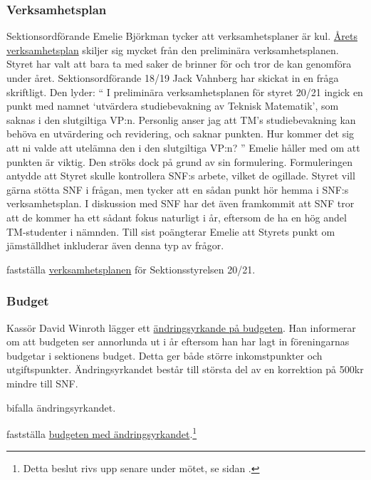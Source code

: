 \documentclass[hidelinks]{../sektionsmote} %
\begin{document}
\subsubsection{Verksamhetsplan}
Sektionsordförande Emelie Björkman tycker att verksamhetsplaner är kul.
\hyperlink{bilagor/styret/vp.pdf.1}{Årets verksamhetsplan} skiljer sig mycket från den preliminära verksamhetsplanen.
Styret har valt att bara ta med saker de brinner för och tror de kan genomföra under året.
Sektionsordförande 18/19 Jack Vahnberg har skickat in en fråga skriftligt.
Den lyder:
\enquote{%
    I preliminära verksamhetsplanen för styret 20/21 ingick en punkt med namnet \enquote{utvärdera studiebevakning av Teknisk Matematik}, som saknas i den slutgiltiga VP:n.
    Personlig anser jag att TM's studiebevakning kan behöva en utvärdering och revidering, och saknar punkten.
    Hur kommer det sig att ni valde att utelämna den i den slutgiltiga VP:n?%
}
Emelie håller med om att punkten är viktig.
Den ströks dock på grund av sin formulering.
Formuleringen antydde att Styret skulle kontrollera SNF:s arbete, vilket de ogillade.
Styret vill gärna stötta SNF i frågan, men tycker att en sådan punkt hör hemma i SNF:s verksamhetsplan.
I diskussion med SNF har det även framkommit att SNF tror att de kommer ha ett sådant fokus naturligt i år, eftersom de ha en hög andel TM-studenter i nämnden.
Till sist poängterar Emelie att Styrets punkt om jämställdhet inkluderar även denna typ av frågor.
\begin{beslut}
    \item fastställa \hyperlink{bilagor/styret/vp.pdf.1}{verksamhetsplanen} för Sektionsstyrelsen 20/21.
\end{beslut}

\subsubsection{Budget}
Kassör David Winroth lägger ett \hyperlink{bilagor/styret/ny-budget.pdf.1}{ändringsyrkande på budgeten}.
Han informerar om att budgeten ser annorlunda ut i år eftersom han har lagt in föreningarnas budgetar i sektionens budget.
Detta ger både större inkomstpunkter och utgiftspunkter.
Ändringsyrkandet består till största del av en korrektion på 500kr mindre till SNF.
\begin{beslut}
    \item bifalla ändringsyrkandet.
    \item fastställa \hyperlink{bilagor/styret/ny-budget.pdf.1}{budgeten med ändringsyrkandet}.\footnote{Detta beslut rivs upp senare under mötet, se sidan \pageref{uppriven-budget}.}\label{budget-orginalbeslut}
\end{beslut}
\end{document}
